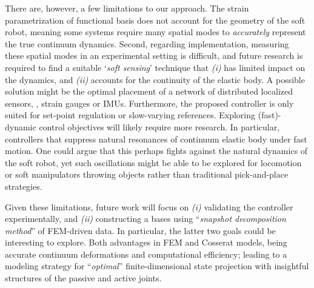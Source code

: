 There are, however, a few limitations to our approach. The strain parametrization of functional basis does not account for the geometry of the soft robot, meaning some systems require many spatial modes to \textit{accurately} represent the true continuum dynamics. Second, regarding implementation, measuring these spatial modes in an experimental setting is difficult, and future research is required to find a suitable `\textit{soft sensing}' technique that  \textit{(i)} has limited impact on the dynamics, and \textit{(ii)} accounts for the continuity of the elastic body. A possible solution might be the optimal placement of a network of distributed localized sensors, \eg, strain gauges or IMUs. Furthermore, the proposed controller is only suited for set-point regulation or slow-varying references. Exploring (fast)-dynamic control objectives will likely require more research. In particular, controllers that suppress natural resonances of continuum elastic body under fast motion. One could argue that this perhaps fights against the natural dynamics of the soft robot, yet such oscillations might be able to be explored for locomotion or soft manipulators throwing objects rather than traditional pick-and-place strategies.

Given these limitations, future work will focus on \textit{(i)} validating the controller experimentally, and \textit{(ii)} constructing a bases using ``\emph{snapshot decomposition method}'' of FEM-driven data. In particular, the latter two goals could be interesting to explore. 
Both advantages in FEM and Cosserat models, being accurate continuum deformations and computational efficiency; leading to a modeling strategy for ``\textit{optimal}'' finite-dimensional state projection with insightful structures of the passive and active joints.

